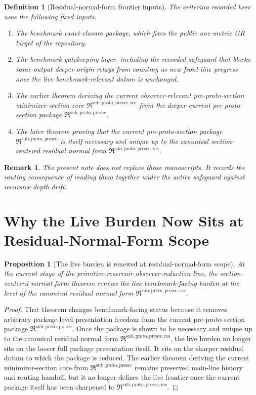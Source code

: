 \documentclass[11pt]{article}
\newcommand{\PreProtoSectionPackage}{\mathfrak R^{\mathrm{sub,proto,presec}}}
\newcommand{\PreProtoSectionMinSectionCore}{\mathfrak R^{\mathrm{sub,proto,presec,sec}}}
\newcommand{\PreProtoSectionResidualPackage}{\mathfrak R^{\mathrm{sub,proto,presec,res}}}
\newtheorem{definition}{Definition}
\newtheorem{proposition}{Proposition}
\newtheorem{remark}{Remark}
\begin{document}
\begin{definition}[Residual-normal-form frontier inputs]
The criterion recorded here uses the following fixed inputs.
\begin{enumerate}
    \item The benchmark exact-closure package, which fixes the public one-metric GR target of the repository.
    \item The benchmark gatekeeping layer, including the recorded safeguard that blocks same-output deeper-origin relays from counting as new front-line progress once the live benchmark-relevant datum is unchanged.
    \item The earlier theorem deriving the current observer-relevant pre-proto-section minimizer-section core \(\PreProtoSectionMinSectionCore\) from the deeper current pre-proto-section package \(\PreProtoSectionPackage\).
    \item The later theorem proving that the current pre-proto-section package \(\PreProtoSectionPackage\) is itself necessary and unique up to the canonical section-centered residual normal form \(\PreProtoSectionResidualPackage\).
\end{enumerate}
\end{definition}

\begin{remark}
The present note does not replace those manuscripts. It records the routing consequence of reading them together under the active safeguard against recursive depth drift.
\end{remark}

\section{Why the Live Burden Now Sits at Residual-Normal-Form Scope}

\begin{proposition}[The live burden is renewed at residual-normal-form scope]
At the current stage of the primitive-reservoir observer-reduction line, the section-centered normal-form theorem renews the live benchmark-facing burden at the level of the canonical residual normal form \(\PreProtoSectionResidualPackage\).
\end{proposition}

\begin{proof}
That theorem changes benchmark-facing status because it removes arbitrary package-level presentation freedom from the current pre-proto-section package \(\PreProtoSectionPackage\). Once the package is shown to be necessary and unique up to the canonical residual normal form \(\PreProtoSectionResidualPackage\), the live burden no longer sits on the looser full package presentation itself. It sits on the sharper residual datum to which the package is reduced. The earlier theorem deriving the current minimizer-section core from \(\PreProtoSectionPackage\) remains preserved main-line history and routing handoff, but it no longer defines the live frontier once the current package itself has been sharpened to \(\PreProtoSectionResidualPackage\).
\end{proof}
\end{document}
